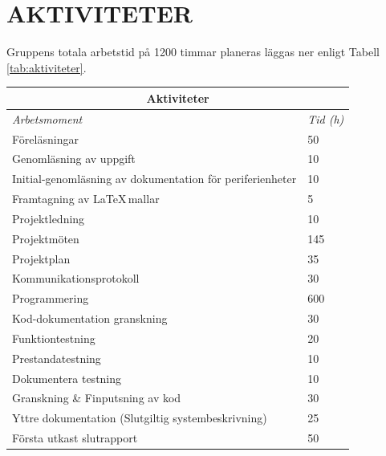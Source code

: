 \documentclass[a4paper]{article}
\begin{document}
\section{AKTIVITETER}
\label{sec:sktiviteter}
Gruppens totala arbetstid på 1200 timmar planeras läggas ner enligt Tabell \ref{tab:aktiviteter}.
\newline

\begin{table}[b]
\begin{tabular}{|l|l|}
\hline
\multicolumn{2}{|c|}{\textbf{Aktiviteter}}                                   \\ \hline
\textit{Arbetsmoment}                                     & \textit{Tid (h)} \\ \hline
Föreläsningar                                             & 50               \\
Genomläsning av uppgift                                   & 10               \\
Initial-genomläsning av dokumentation för periferienheter & 10               \\
Framtagning av \LaTeX \,mallar                            & 5                \\
Projektledning                                            & 10               \\
Projektmöten                                              & 145              \\
Projektplan                                               & 35               \\
Kommunikationsprotokoll                                   & 30               \\
Programmering                                             & 600              \\
Kod-dokumentation granskning                              & 30               \\
Funktiontestning                                          & 20               \\
Prestandatestning                                         & 10               \\
Dokumentera testning                                      & 10               \\
Granskning \& Finputsning av kod                          & 30               \\
Yttre dokumentation (Slutgiltig systembeskrivning)        & 25               \\
Första utkast slutrapport                                 & 50               \\

\end{tabular}
\end{table}
\end{document}
